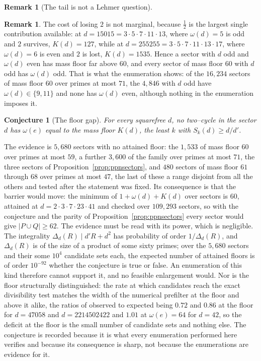\documentclass[11pt]{article}
\newtheorem{conjecture}[theorem]{Conjecture}
\theoremstyle{definition}
\newtheorem{remark}[theorem]{Remark}
\begin{document}
\begin{remark}[The tail is not a Lehmer question]
\begin{remark}
The cost of losing $2$ is not marginal, because $\tfrac12$ is the largest single contribution
available: at $d=15015=3\cdot5\cdot7\cdot11\cdot13$, where $\omega(d)=5$ is odd and $2$ survives,
$K(d)=127$, while at $d=255255=3\cdot5\cdot7\cdot11\cdot13\cdot17$, where $\omega(d)=6$ is even and
$2$ is lost, $K(d)=1535$. Hence a sector with $d$ odd and $\omega(d)$ even has mass floor far above
$60$, and every sector of mass floor $60$ with $d$ odd has $\omega(d)$ odd. That is what the
enumeration shows: of the $16{,}234$ sectors of mass floor $60$ over primes at most $71$, the
$4{,}846$ with $d$ odd have $\omega(d)\in\{9,11\}$ and none has $\omega(d)$ even, although nothing in
the enumeration imposes it.

\begin{conjecture}[The floor gap]\label{conj:floorgap}
For every squarefree $d$, no two--cycle in the sector $d$ has $\omega(e)$ equal to the mass floor
$K(d)$, the least $k$ with $S_k(d)\ge d/d'$.
\end{conjecture}

The evidence is $5{,}680$ sectors with no attained floor: the $1{,}533$ of mass floor $60$ over primes
at most $59$, a further $3{,}600$ of the family over primes at most $71$, the three sectors of
Proposition~\ref{prop:ppnsectors}, and $480$ sectors of mass floor $61$ through $68$ over primes at
most $47$, the last of these a range disjoint from all the others and tested after the statement was
fixed. Its consequence is that the barrier would move: the minimum of $1+\omega(d)+K(d)$ over sectors
is $60$, attained at $d=2\cdot3\cdot7\cdot23\cdot41$ and checked over $109{,}293$ sectors, so with the
conjecture and the parity of Proposition~\ref{prop:ppnsectors} every sector would give
$|P\cup Q|\ge62$. The evidence must be read with its power, which is negligible. The integrality
$\Delta_d(R)\mid d'R+d^2$ has probability of order $1/\Delta_d(R)$, and $\Delta_d(R)$ is of the size
of a product of some sixty primes; over the $5{,}680$ sectors and their some $10^4$ candidate sets
each, the expected number of attained floors is of order $10^{-92}$ whether the conjecture is true or
false. An enumeration of this kind therefore cannot support it, and no feasible enlargement would.
Nor is the floor structurally distinguished: the rate at which candidates reach the exact divisibility
test matches the width of the numerical prefilter at the floor and above it alike, the ratios of
observed to expected being $0.72$ and $0.86$ at the floor for $d=47058$ and $d=2214502422$ and $1.01$
at $\omega(e)=64$ for $d=42$, so the deficit at the floor is the small number of candidate sets and
nothing else. The conjecture is recorded because it is what every enumeration performed here
verifies and because its consequence is sharp, not because the enumerations are evidence for it.


\end{remark}
\end{remark}
\end{document}
